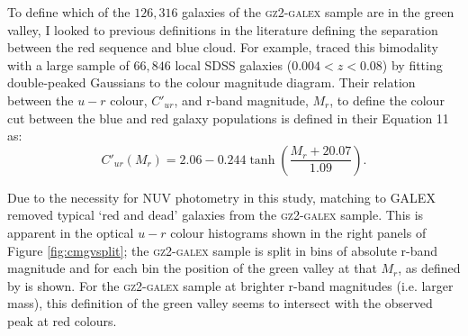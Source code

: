 To define which of the $126, 316$ galaxies of the \textsc{gz2-galex} sample are in the green valley, I looked to previous definitions in the literature defining the separation between the red sequence and blue cloud. For example, \citet{Baldry04} traced this bimodality with a large sample of $66,846$ local SDSS galaxies ($0.004 < z < 0.08$) by fitting double-peaked Gaussians to the colour magnitude diagram. Their relation between the $u-r$ colour, $C'_{ur}$, and r-band magnitude, $M_r$, to define the colour cut between the blue and red galaxy populations is defined in their Equation 11 as:
\begin{equation}\label{eqgv}
C'_{ur}(M_{r}) = 2.06 - 0.244 \tanh \left( \frac{M_r + 20.07}{1.09}\right).
\end{equation}

Due to the necessity for NUV photometry in this study, matching to GALEX removed typical `red and dead' galaxies from the \textsc{gz2-galex} sample. This is apparent in the optical $u-r$ colour histograms shown in the right panels of Figure \ref{fig:cmgvsplit}; the \textsc{gz2-galex} sample is split in bins of absolute r-band magnitude and for each bin the position of the green valley at that $M_r$, as defined by \citet{Baldry04} is shown. For the \textsc{gz2-galex} sample at brighter r-band magnitudes (i.e. larger mass), this definition of the green valley seems to intersect with the observed peak at red colours. 

